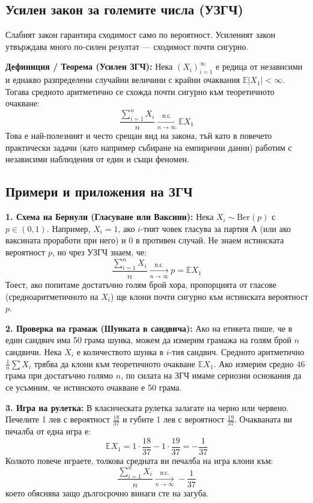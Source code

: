 \documentclass{article}
\begin{document}
\subsection{Усилен закон за големите числа (УЗГЧ)}

Слабият закон гарантира сходимост само по вероятност. Усиленият закон утвърждава много по-силен резултат — сходимост почти сигурно.

\textbf{Дефиниция / Теорема (Усилен ЗГЧ):} Нека $(X_i)_{i=1}^\infty$ е редица от независими и еднакво разпределени случайни величини с крайни очаквания $\mathbb{E}|X_1| < \infty$. Тогава средното аритметично се схожда почти сигурно към теоретичното очакване:
\[
\frac{\sum_{i=1}^n X_i}{n} \xrightarrow[n \to \infty]{\text{п.с.}} \mathbb{E} X_1
\]
Това е най-полезният и често срещан вид на закона, тъй като в повечето практически задачи (като например събиране на емпирични данни) работим с независими наблюдения от един и същи феномен.

\subsection{Примери и приложения на ЗГЧ}

\textbf{1. Схема на Бернули (Гласуване или Ваксини):}
Нека $X_i \sim \text{Ber}(p)$ с $p \in (0,1)$. Например, $X_i = 1$, ако $i$-тият човек гласува за партия А (или ако ваксината проработи при него) и $0$ в противен случай. Не знаем истинската вероятност $p$, но чрез УЗГЧ знаем, че:
\[
\frac{\sum_{i=1}^n X_i}{n} \xrightarrow[n \to \infty]{\text{п.с.}} p = \mathbb{E}X_1
\]
Тоест, ако попитаме достатъчно голям брой хора, пропорцията от гласове (средноаритметичното на $X_i$) ще клони почти сигурно към истинската вероятност $p$.

\textbf{2. Проверка на грамаж (Шунката в сандвича):}
Ако на етикета пише, че в един сандвич има 50 грама шунка, можем да измерим грамажа на голям брой $n$ сандвичи. Нека $X_i$ е количеството шунка в $i$-тия сандвич. Средното аритметично $\frac{1}{n}\sum X_i$ трябва да клони към теоретичното очакване $\mathbb{E}X_1$. Ако измерим средно 46 грама при достатъчно голямо $n$, по силата на ЗГЧ имаме сериозни основания да се усъмним, че истинското очакване е 50 грама.

\textbf{3. Игра на рулетка:}
В класическата рулетка залагате на черно или червено. Печелите 1 лев с вероятност $\frac{18}{37}$ и губите 1 лев с вероятност $\frac{19}{37}$. Очакваната ви печалба от една игра е:
\[
\mathbb{E}X_1 = 1 \cdot \frac{18}{37} - 1 \cdot \frac{19}{37} = -\frac{1}{37}
\]
Колкото повече играете, толкова средната ви печалба на игра клони към:
\[
\frac{\sum_{i=1}^n X_i}{n} \xrightarrow[n \to \infty]{\text{п.с.}} -\frac{1}{37}
\]
което обяснява защо дългосрочно винаги сте на загуба.
\end{document}
